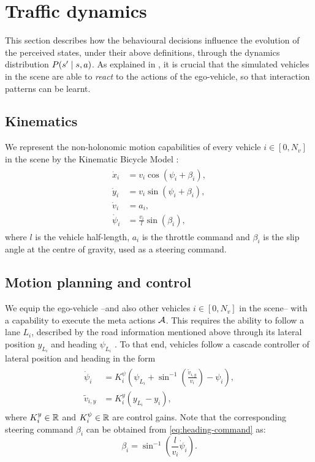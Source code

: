 \section{Traffic dynamics}

This section describes how the behavioural decisions influence the evolution of the perceived states, under their above definitions, through the dynamics distribution $P\lparen s' \mid s,a\rparen$. As explained in , it is crucial that the simulated vehicles in the scene are able to \emph{react} to the actions of the ego-vehicle, so that interaction patterns can be learnt.

\subsection{Kinematics}

We represent the non-holonomic motion capabilities of every vehicle $i\in[0, N_v]$ in the scene by the Kinematic Bicycle Model \citep[see \eg][]{Polack2017}:
\begin{align}
\begin{split}
\dot{x}_i &= v_i\cos(\psi_i + \beta_i), \\
\dot{y}_i &= v_i\sin(\psi_i + \beta_i),\\
\dot{v}_i &= a_i,\\
\dot{\psi}_i &= \frac{v_i}{l}\sin(\beta_i),
\end{split}
\end{align}
where $l$ is the vehicle half-length, $a_i$ is the throttle command and $\beta_i$ is the slip angle at the centre of gravity, used as a steering command.

\subsection{Motion planning and control}

We equip the ego-vehicle --and also other vehicles $i\in[0, N_v]$ in the scene-- with a capability to execute the meta actions $\mathcal{A}$. This requires the ability to follow a lane $L_i$, described by the road information mentioned above through its lateral position $y_{L_i}$ and heading $\psi_{L_i}$ . To that end, vehicles follow a cascade controller of lateral position and heading in the form
\begin{align}
\label{eq:heading-command}
\begin{split}
\dot{\psi}_i &= K_i^\psi\left(\psi_{L_i}+\sin^{-1}\left(\frac{\tilde{v}_{i,y}}{v_i}\right)-\psi_i\right),\\
\tilde{v}_{i,y} &= K_i^y (y_{L_i}-y_i),
\end{split}
\end{align}
where $K_i^y\in\mathbb{R}$ and $K_i^\psi\in\mathbb{R}$ are control gains.
Note that the corresponding steering command $\beta_i$ can be obtained from \eqref{eq:heading-command} as: $$\beta_i = \sin^{-1}\left(\frac{l}{v_i}\dot{\psi}_i\right).$$

